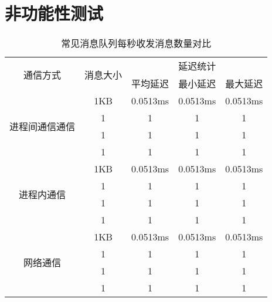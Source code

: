\section{非功能性测试}
\begin{table}[htb]
  \centering\small
  \caption{常见消息队列每秒收发消息数量对比}
  \label{tab:exampletable}
  \begin{tabular}{ccccc}
    \toprule
    \multirow{2}{*}{通信方式} & \multirow{2}{*}{消息大小} & \multicolumn{3}{c}{延迟统计}\\
     & & 平均延迟 & 最小延迟 & 最大延迟\\
    \midrule
    \multirow{4}{*}{进程间通信通信} & 1KB& 0.0513ms& 0.0513ms& 0.0513ms\\ & 1 & 1 & 1 & 1 \\ & 1 & 1 & 1 & 1 \\ & 1 & 1 & 1 & 1\\
    \hline
    \multirow{4}{*}{进程内通信} & 1KB& 0.0513ms& 0.0513ms& 0.0513ms\\ & 1 & 1 & 1 & 1 \\ & 1 & 1 & 1 & 1 \\ & 1 & 1 & 1 & 1\\
    \hline
    \multirow{4}{*}{网络通信} & 1KB& 0.0513ms& 0.0513ms& 0.0513ms\\ & 1 & 1 & 1 & 1 \\ & 1 & 1 & 1 & 1 \\ & 1 & 1 & 1 & 1\\
    \bottomrule
  \end{tabular}
\end{table}